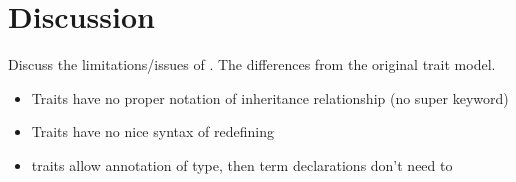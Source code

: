 
\section{Discussion}
\label{sec:discuss}

Discuss the limitations/issues of \name. The differences from the original trait model.



\begin{itemize}
\item Traits have no proper notation of inheritance relationship (no super keyword)
\item Traits have no nice syntax of redefining
\item traits allow annotation of type, then term declarations don't need to
\end{itemize}